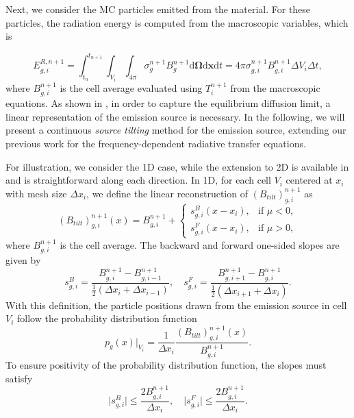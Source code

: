 \documentclass[preprint,12pt]{elsarticle}
\theoremstyle{definition}
\theoremstyle{plain}
\numberwithin{equation}{section}
\numberwithin{algorithm}{section}
\newcounter{eq_count}
\newcommand{\vOmega}{\mathbf{\Omega}}
\newcommand{\vx}{\mathbf{x}}
\newcommand{\dd}{{\text{d}}}
\begin{document}
Next, we consider the MC particles emitted from the material. For these particles, the radiation energy is computed from the macroscopic variables, which is

\begin{equation}\label{eq_sample_em}
E_{g,i}^{R,n+1}=\int_{t_n}^{t_{n+1}} \int_{V_i} \int_{4 \pi} \sigma_g^{n+1} B_g^{n+1}\dd{\vOmega} \dd{\vx} \dd{t}=   4 \pi \sigma_{g,i}^{n+1} B_{g,i}^{n+1} \Delta V_i \Delta t,
\end{equation}
where $B_{g,i}^{n+1}$ is the cell average evaluated using $T^{n+1}_i$ from the macroscopic equations. As shown in  \cite{fleck1984random,shi2020continuous,densmore2011asymptotic}, in order to capture the equilibrium diffusion limit, a linear representation of the emission source is necessary. In the following, we will present a continuous \textit{source tilting} method for the emission source, extending our previous work \cite{shi2020continuous} for the frequency-dependent radiative transfer equations.

For illustration, we consider the 1D case, while the extension to 2D is available in \cite{shi2020continuous} and is straightforward along each direction. In 1D, for each cell
 $V_i$ centered at $x_i$ with mesh size $\Delta x_i$, we define the  linear reconstruction of $ (B_{tilt})^{n+1}_{g,i}$ as 
\begin{equation}\label{eq_sourceTilting}
(B_{tilt})^{n+1}_{g,i}(x) = B^{n+1}_{g,i} + 
\begin{cases} 
s^{B}_{g,i } \left( x - x_i \right), & \text{if } \mu < 0, \\
s^{F}_{g,i } \left( x - x_i \right), & \text{if } \mu > 0,
\end{cases}
\end{equation}
where $B_{g,i}^{n+1}$ is the cell average. The backward and forward one-sided slopes are given by
\begin{equation*}
s^{B}_{g,i } = \frac{B_{g,i}^{n+1} - B^{n+1}_{g,i - 1}}{\frac{1}{2}( \Delta x_i   + \Delta x_{i-1} ) }, \quad s^{F}_{g,i } = \frac{B^{n+1}_{g,i + 1} - B^{n+1}_{g,i}}{\frac{1}{2}( \Delta x_{i+1}   + \Delta x_{i} )}.
\end{equation*}
With this definition, the particle positions drawn from the emission source in cell $V_i$ follow the probability distribution function
\begin{equation}\label{eq_sourceTilting_PDF}
    p_{g}(x)\Big|_{V_i} = \frac{1}{\Delta x_i} \frac{(B_{tilt})_{g,i}^{n+1}(x)}{ B^{n+1}_{g,i}}.
\end{equation}
To ensure positivity of the probability distribution function, the slopes must satisfy \cite{densmore2011asymptotic}
\begin{equation*}
    \lvert s^{B}_{g,i } \rvert \leq \frac{2B^{n+1}_{g,i}}{\Delta x_i}, \quad
     \lvert s^{F}_{g,i } \rvert \leq \frac{2B^{n+1}_{g,i}}{\Delta x_i}.
\end{equation*}
\end{document}

